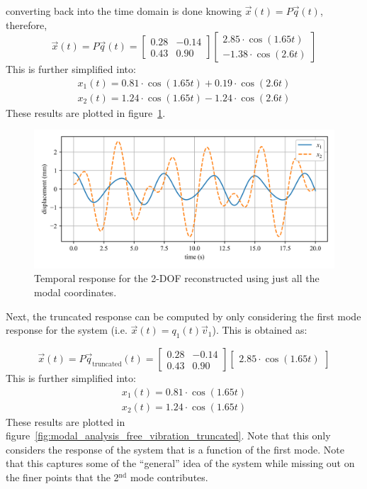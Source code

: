 \documentclass[12pt,letter]{article}
\begin{document}
\begin{example}
	converting back into the time domain is done knowing $\vec{x}(t) = P\vec{q}(t)$, therefore, 
	\begin{equation}
	\vec{x}(t) = P\vec{q}(t) = \begin{bmatrix} 0.28 & -0.14 \\    0.43  & 0.90 \end{bmatrix}  \begin{bmatrix} 2.85 \cdot \cos (1.65 t) \\  -1.38 \cdot \cos (2.6 t) \end{bmatrix}
	\end{equation}
	This is further simplified into:
	\begin{eqnarray}
	x_1(t) = 0.81 \cdot \cos (1.65 t) + 0.19 \cdot \cos (2.6 t) \\ 
	x_2(t) = 1.24 \cdot \cos (1.65 t) - 1.24 \cdot \cos (2.6 t)  \nonumber
	\end{eqnarray}
	These results are plotted in figure~\ref{fig:modal_analysis_free_vibration}.
	\begin{figure}[H]
		\centering
		\includegraphics[width=\linewidth]{../figures/modal_analysis_free_vibration.png}
		\caption{Temporal response for the 2-DOF reconstructed using just all the modal coordinates.}
		\label{fig:modal_analysis_free_vibration}
	\end{figure}
	
	Next, the truncated response can be computed by only considering the first mode response for the system (i.e. $\vec{x}(t) = q_1(t) \vec{v}_1$). This is obtained as:
	
	\begin{equation}
	\vec{x}(t) = P\vec{q}_\text{truncated}(t) = \begin{bmatrix} 0.28 & -0.14 \\    0.43  & 0.90 \end{bmatrix}  \begin{bmatrix} 2.85 \cdot \cos (1.65 t) \end{bmatrix}
	\end{equation}
	This is further simplified into:
	\begin{eqnarray}
	x_1(t) = 0.81 \cdot \cos (1.65 t) \\ 
	x_2(t) = 1.24 \cdot \cos (1.65 t) \nonumber
	\end{eqnarray}
	These results are plotted in figure~\ref{fig:modal_analysis_free_vibration_truncated}. Note that this only considers the response of the system that is a function of the first mode. Note that this captures some of the ``general'' idea of the system while missing out on the finer points that the 2$^{\text{nd}}$ mode contributes. 
	

\end{example}
\end{document}
